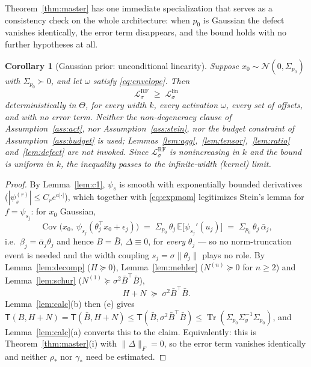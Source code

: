 \documentclass[11pt]{article}
\newtheorem{corollary}{Corollary}
\theoremstyle{remark}
\newcommand{\E}{\mathbb{E}}
\newcommand{\Tr}{\operatorname{Tr}}
\newcommand{\Cov}{\operatorname{Cov}}
\newcommand{\Sig}{\Sigma_{p_0}}
\newcommand{\Sy}{\Sigma_y}
\newcommand{\Fro}[1]{\lVert #1 \rVert_F}
\newcommand{\TT}{\mathsf{T}}
\begin{document}
Theorem~\ref{thm:master} has one immediate specialization that serves as a consistency check on the whole architecture: when $p_0$ is Gaussian the defect vanishes identically, the error term disappears, and the bound holds with no further hypotheses at all.

\begin{corollary}[Gaussian prior: unconditional linearity]\label{cor:gauss}
Suppose $x_0 \sim \mathcal N(0, \Sig)$ with $\Sig \succ 0$, and let $\omega$ satisfy \eqref{eq:envelope}. Then
\[
\mathcal L^{\mathrm{RF}}_\sigma \;\ge\; \mathcal L^{\mathrm{lin}}_\sigma
\]
\emph{deterministically in $\Theta$}, for every width $k$, every activation $\omega$, every set of offsets, and with no error term. Neither the non-degeneracy clause of Assumption~\ref{ass:act}, nor Assumption~\ref{ass:stein}, nor the budget constraint of Assumption~\ref{ass:budget} is used; Lemmas~\ref{lem:agg},~\ref{lem:tensor},~\ref{lem:ratio} and~\ref{lem:defect} are not invoked. Since $\mathcal L^{\mathrm{RF}}_\sigma$ is nonincreasing in $k$ and the bound is uniform in $k$, the inequality passes to the infinite-width (kernel) limit.
\end{corollary}

\begin{proof}
By Lemma~\ref{lem:c1}, $\psi_{s}$ is smooth with exponentially bounded derivatives ($|\psi_s^{(r)}| \le C_re^{a|\cdot|}$), which together with \eqref{eq:expmom} legitimizes Stein's lemma for $f = \psi_{s_j}$: for $x_0$ Gaussian,
\[
\Cov\big(x_0,\ \psi_{s_j}(\theta_j^\top x_0 + \epsilon_j)\big) \;=\; \Sig\,\theta_j\,\E\big[\psi_{s_j}'(u_j)\big] \;=\; \Sig\,\theta_j\,\bar\alpha_j ,
\]
i.e.\ $\beta_j = \bar\alpha_j\theta_j$ and hence $B = \bar B$, $\Delta \equiv 0$, for \emph{every} $\theta_j$ --- so no norm-truncation event is needed and the width coupling $s_j = \sigma\lVert\theta_j\rVert$ plays no role. By Lemma~\ref{lem:decomp} ($H \succeq 0$), Lemma~\ref{lem:mehler} ($N^{(n)} \succeq 0$ for $n \ge 2$) and Lemma~\ref{lem:schur} ($N^{(1)} \succeq \sigma^2\bar B^\top\bar B$),
\[
H + N \;\succeq\; \sigma^2\bar B^\top\bar B .
\]
Lemma~\ref{lem:calc}(b) then (e) gives $\TT(B, H+N) = \TT(\bar B, H+N) \le \TT(\bar B, \sigma^2\bar B^\top\bar B) \le \Tr(\Sig\Sy^{-1}\Sig)$, and Lemma~\ref{lem:calc}(a) converts this to the claim. Equivalently: this is Theorem~\ref{thm:master}(i) with $\Fro{\Delta} = 0$, so the error term vanishes identically and neither $\rho_*$ nor $\gamma_*$ need be estimated.
\end{proof}
\end{document}
